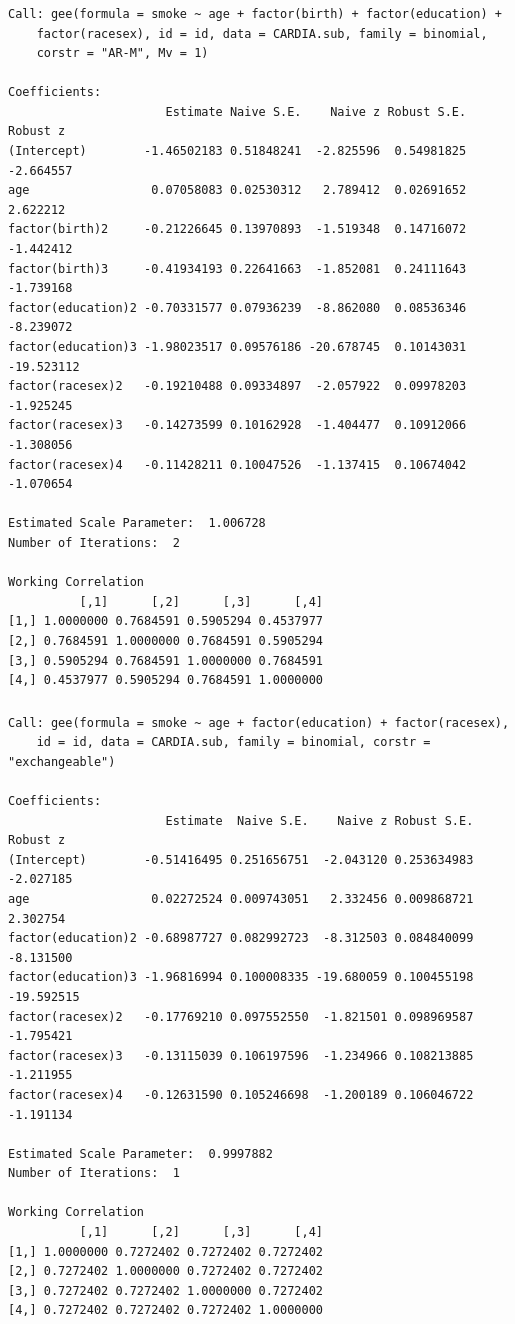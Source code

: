 \documentclass{beamer}
\begin{document}
\begin{frame}[fragile]
\frametitle{}
{\tiny
\begin{verbatim}
Call: gee(formula = smoke ~ age + factor(birth) + factor(education) + 
    factor(racesex), id = id, data = CARDIA.sub, family = binomial, 
    corstr = "AR-M", Mv = 1)

Coefficients:
                      Estimate Naive S.E.    Naive z Robust S.E.   Robust z
(Intercept)        -1.46502183 0.51848241  -2.825596  0.54981825  -2.664557
age                 0.07058083 0.02530312   2.789412  0.02691652   2.622212
factor(birth)2     -0.21226645 0.13970893  -1.519348  0.14716072  -1.442412
factor(birth)3     -0.41934193 0.22641663  -1.852081  0.24111643  -1.739168
factor(education)2 -0.70331577 0.07936239  -8.862080  0.08536346  -8.239072
factor(education)3 -1.98023517 0.09576186 -20.678745  0.10143031 -19.523112
factor(racesex)2   -0.19210488 0.09334897  -2.057922  0.09978203  -1.925245
factor(racesex)3   -0.14273599 0.10162928  -1.404477  0.10912066  -1.308056
factor(racesex)4   -0.11428211 0.10047526  -1.137415  0.10674042  -1.070654

Estimated Scale Parameter:  1.006728
Number of Iterations:  2

Working Correlation
          [,1]      [,2]      [,3]      [,4]
[1,] 1.0000000 0.7684591 0.5905294 0.4537977
[2,] 0.7684591 1.0000000 0.7684591 0.5905294
[3,] 0.5905294 0.7684591 1.0000000 0.7684591
[4,] 0.4537977 0.5905294 0.7684591 1.0000000
\end{verbatim}
}
\end{frame}

\begin{frame}[fragile]
\frametitle{}
{\tiny
\begin{verbatim}
Call: gee(formula = smoke ~ age + factor(education) + factor(racesex), 
    id = id, data = CARDIA.sub, family = binomial, corstr = "exchangeable")

Coefficients:
                      Estimate  Naive S.E.    Naive z Robust S.E.   Robust z
(Intercept)        -0.51416495 0.251656751  -2.043120 0.253634983  -2.027185
age                 0.02272524 0.009743051   2.332456 0.009868721   2.302754
factor(education)2 -0.68987727 0.082992723  -8.312503 0.084840099  -8.131500
factor(education)3 -1.96816994 0.100008335 -19.680059 0.100455198 -19.592515
factor(racesex)2   -0.17769210 0.097552550  -1.821501 0.098969587  -1.795421
factor(racesex)3   -0.13115039 0.106197596  -1.234966 0.108213885  -1.211955
factor(racesex)4   -0.12631590 0.105246698  -1.200189 0.106046722  -1.191134

Estimated Scale Parameter:  0.9997882
Number of Iterations:  1

Working Correlation
          [,1]      [,2]      [,3]      [,4]
[1,] 1.0000000 0.7272402 0.7272402 0.7272402
[2,] 0.7272402 1.0000000 0.7272402 0.7272402
[3,] 0.7272402 0.7272402 1.0000000 0.7272402
[4,] 0.7272402 0.7272402 0.7272402 1.0000000
\end{verbatim}
}
\end{frame}
\end{document}
